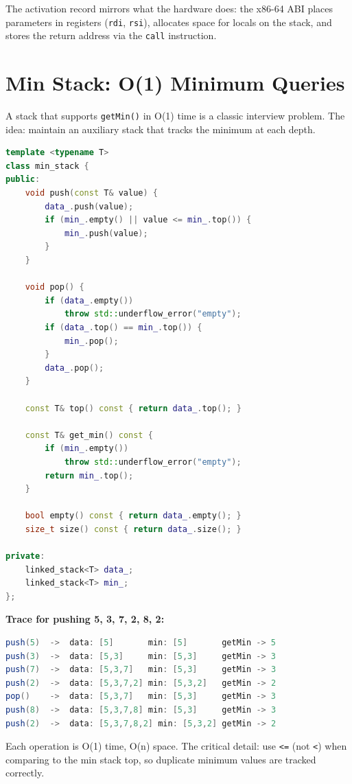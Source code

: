 The activation record mirrors what the hardware does: the x86-64 ABI places parameters in registers (\texttt{rdi}, \texttt{rsi}), allocates space for locals on the stack, and stores the return address via the \texttt{call} instruction.

\section{Min Stack: O(1) Minimum Queries}

A stack that supports \texttt{getMin()} in O(1) time is a classic interview problem. The idea: maintain an auxiliary stack that tracks the minimum at each depth.

\begin{lstlisting}[language=C++]
template <typename T>
class min_stack {
public:
    void push(const T& value) {
        data_.push(value);
        if (min_.empty() || value <= min_.top()) {
            min_.push(value);
        }
    }

    void pop() {
        if (data_.empty())
            throw std::underflow_error("empty");
        if (data_.top() == min_.top()) {
            min_.pop();
        }
        data_.pop();
    }

    const T& top() const { return data_.top(); }

    const T& get_min() const {
        if (min_.empty())
            throw std::underflow_error("empty");
        return min_.top();
    }

    bool empty() const { return data_.empty(); }
    size_t size() const { return data_.size(); }

private:
    linked_stack<T> data_;
    linked_stack<T> min_;
};
\end{lstlisting}

\textbf{Trace for pushing 5, 3, 7, 2, 8, 2:}

\begin{lstlisting}[language=Java]
push(5)  ->  data: [5]       min: [5]       getMin -> 5
push(3)  ->  data: [5,3]     min: [5,3]     getMin -> 3
push(7)  ->  data: [5,3,7]   min: [5,3]     getMin -> 3
push(2)  ->  data: [5,3,7,2] min: [5,3,2]   getMin -> 2
pop()    ->  data: [5,3,7]   min: [5,3]     getMin -> 3
push(8)  ->  data: [5,3,7,8] min: [5,3]     getMin -> 3
push(2)  ->  data: [5,3,7,8,2] min: [5,3,2] getMin -> 2
\end{lstlisting}

Each operation is O(1) time, O(n) space. The critical detail: use \texttt{<=} (not \texttt{<}) when comparing to the min stack top, so duplicate minimum values are tracked correctly.

